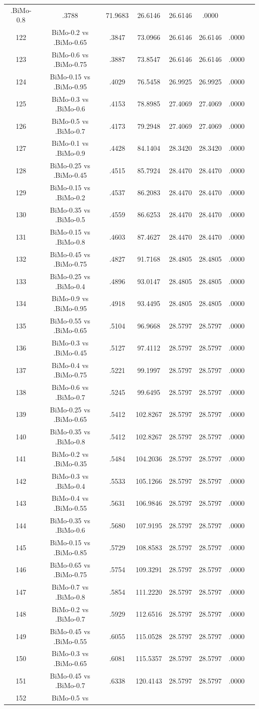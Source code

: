 \documentclass[a4paper,10pt]{article}
\begin{document}
\begin{landscape}
\begin{table}[!htp]
\begin{tabular}{cccccccc}
.BiMo-0.8&.3788&71.9683&26.6146&26.6146&.0000\\122&BiMo-0.2 vs .BiMo-0.65&.3847&73.0966&26.6146&26.6146&.0000\\123&BiMo-0.6 vs .BiMo-0.75&.3887&73.8547&26.6146&26.6146&.0000\\124&BiMo-0.15 vs .BiMo-0.95&.4029&76.5458&26.9925&26.9925&.0000\\125&BiMo-0.3 vs .BiMo-0.6&.4153&78.8985&27.4069&27.4069&.0000\\126&BiMo-0.5 vs .BiMo-0.7&.4173&79.2948&27.4069&27.4069&.0000\\127&BiMo-0.1 vs .BiMo-0.9&.4428&84.1404&28.3420&28.3420&.0000\\128&BiMo-0.25 vs .BiMo-0.45&.4515&85.7924&28.4470&28.4470&.0000\\129&BiMo-0.15 vs .BiMo-0.2&.4537&86.2083&28.4470&28.4470&.0000\\130&BiMo-0.35 vs .BiMo-0.5&.4559&86.6253&28.4470&28.4470&.0000\\131&BiMo-0.15 vs .BiMo-0.8&.4603&87.4627&28.4470&28.4470&.0000\\132&BiMo-0.45 vs .BiMo-0.75&.4827&91.7168&28.4805&28.4805&.0000\\133&BiMo-0.25 vs .BiMo-0.4&.4896&93.0147&28.4805&28.4805&.0000\\134&BiMo-0.9 vs .BiMo-0.95&.4918&93.4495&28.4805&28.4805&.0000\\135&BiMo-0.55 vs .BiMo-0.65&.5104&96.9668&28.5797&28.5797&.0000\\136&BiMo-0.3 vs .BiMo-0.45&.5127&97.4112&28.5797&28.5797&.0000\\137&BiMo-0.4 vs .BiMo-0.75&.5221&99.1997&28.5797&28.5797&.0000\\138&BiMo-0.6 vs .BiMo-0.7&.5245&99.6495&28.5797&28.5797&.0000\\139&BiMo-0.25 vs .BiMo-0.65&.5412&102.8267&28.5797&28.5797&.0000\\140&BiMo-0.35 vs .BiMo-0.8&.5412&102.8267&28.5797&28.5797&.0000\\141&BiMo-0.2 vs .BiMo-0.35&.5484&104.2036&28.5797&28.5797&.0000\\142&BiMo-0.3 vs .BiMo-0.4&.5533&105.1266&28.5797&28.5797&.0000\\143&BiMo-0.4 vs .BiMo-0.55&.5631&106.9846&28.5797&28.5797&.0000\\144&BiMo-0.35 vs .BiMo-0.6&.5680&107.9195&28.5797&28.5797&.0000\\145&BiMo-0.15 vs .BiMo-0.85&.5729&108.8583&28.5797&28.5797&.0000\\146&BiMo-0.65 vs .BiMo-0.75&.5754&109.3291&28.5797&28.5797&.0000\\147&BiMo-0.7 vs .BiMo-0.8&.5854&111.2220&28.5797&28.5797&.0000\\148&BiMo-0.2 vs .BiMo-0.7&.5929&112.6516&28.5797&28.5797&.0000\\149&BiMo-0.45 vs .BiMo-0.55&.6055&115.0528&28.5797&28.5797&.0000\\150&BiMo-0.3 vs .BiMo-0.65&.6081&115.5357&28.5797&28.5797&.0000\\151&BiMo-0.45 vs .BiMo-0.7&.6338&120.4143&28.5797&28.5797&.0000\\152&BiMo-0.5 vs 
\end{tabular}
\end{table}
\end{landscape}
\end{document}
